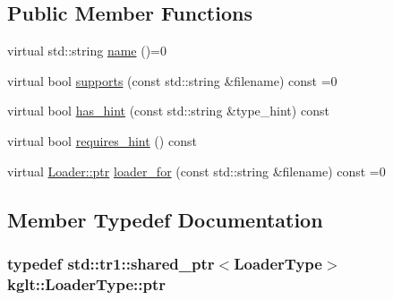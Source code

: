 \subsection*{Public Member Functions}
\begin{DoxyCompactItemize}
\item 
virtual std\-::string \hyperlink{classkglt_1_1_loader_type_a0151bad82db12b7a735398c38a04ed00}{name} ()=0
\item 
virtual bool \hyperlink{classkglt_1_1_loader_type_a5b25e57c09c5f73c009b839c8504c16d}{supports} (const std\-::string \&filename) const =0
\item 
virtual bool \hyperlink{classkglt_1_1_loader_type_a34391c6185f95a716644d38ed2e55f19}{has\-\_\-hint} (const std\-::string \&type\-\_\-hint) const 
\item 
virtual bool \hyperlink{classkglt_1_1_loader_type_abf3dbb77441fabb0a1e6cd5efed6a5d7}{requires\-\_\-hint} () const 
\item 
virtual \hyperlink{classkglt_1_1_loader_a8755ac58226017c031594bfd682a08f8}{Loader\-::ptr} \hyperlink{classkglt_1_1_loader_type_a88ae1437621f0f57fb7dc3861d111e05}{loader\-\_\-for} (const std\-::string \&filename) const =0
\end{DoxyCompactItemize}


\subsection{Member Typedef Documentation}
\hypertarget{classkglt_1_1_loader_type_aac97975ad71c116297a557c5ca1e993b}{
\subsubsection[{ptr}]{\setlength{\rightskip}{0pt plus 5cm}typedef std\-::tr1\-::shared\-\_\-ptr$<${\bf Loader\-Type}$>$ {\bf kglt\-::\-Loader\-Type\-::ptr}}}\label{classkglt_1_1_loader_type_aac97975ad71c116297a557c5ca1e993b}


